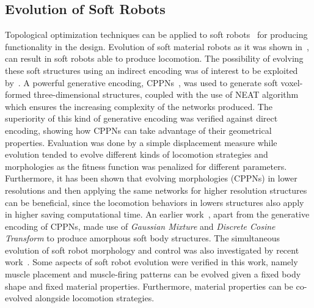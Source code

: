 \documentclass{sig-alternate}
\begin{document}


\subsection{Evolution of Soft Robots}

Topological optimization techniques can be applied to soft robots~\cite{hiller2009multi} for producing functionality in the design. Evolution of soft material robots as it was shown in~\cite{hiller2012automatic}, can result in soft robots able to produce locomotion. The possibility of evolving these soft structures using an indirect encoding was of interest to be exploited by~\cite{cheney2013unshackling}. A powerful generative encoding, CPPNs~\cite{stanley2007compositional}, was used to generate soft voxel-formed three-dimensional structures, coupled with the use of NEAT algorithm which ensures the increasing complexity of the networks produced. The superiority of this kind of generative encoding was verified against direct encoding, showing how CPPNs can take advantage of their geometrical properties. Evaluation was done by a simple displacement measure while evolution tended to evolve different kinds of locomotion strategies and morphologies as the fitness function was penalized for different parameters. Furthermore, it has been shown that evolving morphologies (CPPNs) in lower resolutions and then applying the same networks for higher resolution structures can be beneficial, since the locomotion behaviors in lowers structures also apply in higher saving computational time. An earlier work~\cite{hiller2010evolving}, apart from the generative encoding of CPPNs, made use of \textit{Gaussian Mixture} and \textit{Discrete Cosine Transform} to produce amorphous soft body structures. The simultaneous evolution of soft robot morphology and control was also investigated by recent work~\cite{rieffel2014growing}. Some aspects of soft robot evolution were verified in this work, namely muscle placement and muscle-firing patterns can be evolved given a fixed body shape and fixed material properties. Furthermore, material properties can be co-evolved alongside locomotion strategies.
\end{document}
